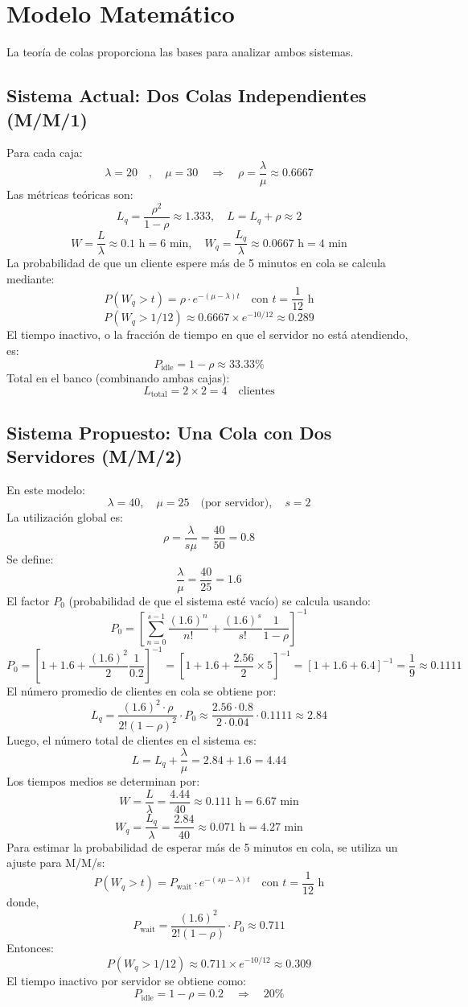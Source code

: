 \documentclass[12pt]{article}
\begin{document}
\section{Modelo Matemático}\label{sec:modelo}
La teoría de colas proporciona las bases para analizar ambos sistemas.

\subsection{Sistema Actual: Dos Colas Independientes (M/M/1)}
Para cada caja:
\[
\lambda = 20 \quad , \quad \mu = 30 \quad \Rightarrow \quad \rho = \frac{\lambda}{\mu} \approx 0.6667
\]
Las métricas teóricas son:
\[
L_q = \frac{\rho^2}{1-\rho} \approx 1.333, \quad L = L_q + \rho \approx 2
\]
\[
W = \frac{L}{\lambda} \approx 0.1 \text{ h} = 6 \text{ min}, \quad W_q = \frac{L_q}{\lambda} \approx 0.0667 \text{ h} = 4 \text{ min}
\]
La probabilidad de que un cliente espere más de 5 minutos en cola se calcula mediante:
\[
P(W_q > t) = \rho \cdot e^{-(\mu - \lambda)t} \quad \text{con } t = \frac{1}{12}\text{ h}
\]
\[
P(W_q > 1/12) \approx 0.6667 \times e^{-10/12} \approx 0.289
\]
El tiempo inactivo, o la fracción de tiempo en que el servidor no está atendiendo, es:
\[
P_{\text{idle}} = 1 - \rho \approx 33.33\%
\]
Total en el banco (combinando ambas cajas):
\[
L_{\text{total}} = 2 \times 2 = 4 \quad \text{clientes}
\]

\subsection{Sistema Propuesto: Una Cola con Dos Servidores (M/M/2)}
En este modelo:
\[
\lambda = 40, \quad \mu = 25 \quad \text{(por servidor)}, \quad s=2
\]
La utilización global es:
\[
\rho = \frac{\lambda}{s\mu} = \frac{40}{50} = 0.8
\]
Se define:
\[
\frac{\lambda}{\mu} = \frac{40}{25} = 1.6
\]
El factor \(P_0\) (probabilidad de que el sistema esté vacío) se calcula usando:
\[
P_0 = \left[\sum_{n=0}^{s-1} \frac{(1.6)^n}{n!} + \frac{(1.6)^s}{s!}\frac{1}{1-\rho}\right]^{-1}
\]
\[
P_0 = \left[1 + 1.6 + \frac{(1.6)^2}{2}\frac{1}{0.2}\right]^{-1} 
= \left[1 + 1.6 + \frac{2.56}{2} \times 5\right]^{-1}
= \left[1 + 1.6 + 6.4\right]^{-1} = \frac{1}{9} \approx 0.1111
\]
El número promedio de clientes en cola se obtiene por:
\[
L_q = \frac{(1.6)^2 \cdot \rho}{2!(1-\rho)^2} \cdot P_0 
\approx \frac{2.56 \cdot 0.8}{2 \cdot 0.04} \cdot 0.1111 \approx 2.84
\]
Luego, el número total de clientes en el sistema es:
\[
L = L_q + \frac{\lambda}{\mu} = 2.84 + 1.6 = 4.44
\]
Los tiempos medios se determinan por:
\[
W = \frac{L}{\lambda} = \frac{4.44}{40} \approx 0.111 \text{ h} = 6.67 \text{ min}
\]
\[
W_q = \frac{L_q}{\lambda} = \frac{2.84}{40} \approx 0.071 \text{ h} = 4.27 \text{ min}
\]
Para estimar la probabilidad de esperar más de 5 minutos en cola, se utiliza un ajuste para M/M/s:
\[
P(W_q > t) = P_{\text{wait}} \cdot e^{-(s\mu-\lambda)t} \quad \text{con } t=\frac{1}{12}\text{ h}
\]
donde,
\[
P_{\text{wait}} = \frac{(1.6)^2}{2!(1-\rho)} \cdot P_0 \approx 0.711
\]
Entonces:
\[
P(W_q > 1/12) \approx 0.711 \times e^{-10/12} \approx 0.309
\]
El tiempo inactivo por servidor se obtiene como:
\[
P_{\text{idle}} = 1-\rho = 0.2 \quad \Rightarrow \quad 20\%
\]
\end{document}
